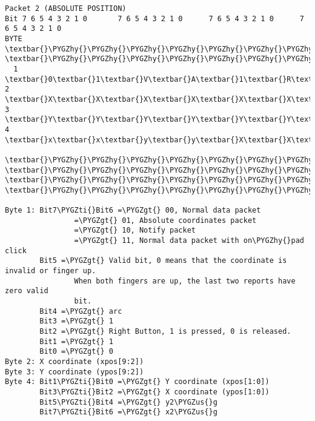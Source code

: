\documentclass[a4paper,8pt,english]{sphinxmanual}
\def\PYGZus{\char`\_}
\def\PYGZgt{\char`\>}
\def\PYGZhy{\char`\-}
\def\PYGZti{\char`\~}
\begin{document}
\begin{Verbatim}[commandchars=\\\{\}]
Packet 2 (ABSOLUTE POSITION)
Bit 7 6 5 4 3 2 1 0       7 6 5 4 3 2 1 0      7 6 5 4 3 2 1 0      7 6 5 4 3 2 1 0
BYTE  \textbar{}\PYGZhy{}\PYGZhy{}\PYGZhy{}\PYGZhy{}\PYGZhy{}\PYGZhy{}\PYGZhy{}\PYGZhy{}\PYGZhy{}\PYGZhy{}\PYGZhy{}\PYGZhy{}\PYGZhy{}\PYGZhy{}\PYGZhy{}\textbar{}BYTE \textbar{}\PYGZhy{}\PYGZhy{}\PYGZhy{}\PYGZhy{}\PYGZhy{}\PYGZhy{}\PYGZhy{}\PYGZhy{}\PYGZhy{}\PYGZhy{}\PYGZhy{}\PYGZhy{}\PYGZhy{}\PYGZhy{}\PYGZhy{}\textbar{}BYTE\textbar{}\PYGZhy{}\PYGZhy{}\PYGZhy{}\PYGZhy{}\PYGZhy{}\PYGZhy{}\PYGZhy{}\PYGZhy{}\PYGZhy{}\PYGZhy{}\PYGZhy{}\PYGZhy{}\PYGZhy{}\PYGZhy{}\PYGZhy{}\textbar{}BYTE\textbar{}\PYGZhy{}\PYGZhy{}\PYGZhy{}\PYGZhy{}\PYGZhy{}\PYGZhy{}\PYGZhy{}\PYGZhy{}\PYGZhy{}\PYGZhy{}\PYGZhy{}\PYGZhy{}\PYGZhy{}\PYGZhy{}\PYGZhy{}\textbar{}
  1   \textbar{}0\textbar{}1\textbar{}V\textbar{}A\textbar{}1\textbar{}R\textbar{}1\textbar{}0\textbar{}  2  \textbar{}X\textbar{}X\textbar{}X\textbar{}X\textbar{}X\textbar{}X\textbar{}X\textbar{}X\textbar{}  3 \textbar{}Y\textbar{}Y\textbar{}Y\textbar{}Y\textbar{}Y\textbar{}Y\textbar{}Y\textbar{}Y\textbar{}  4 \textbar{}x\textbar{}x\textbar{}y\textbar{}y\textbar{}X\textbar{}X\textbar{}Y\textbar{}Y\textbar{}
      \textbar{}\PYGZhy{}\PYGZhy{}\PYGZhy{}\PYGZhy{}\PYGZhy{}\PYGZhy{}\PYGZhy{}\PYGZhy{}\PYGZhy{}\PYGZhy{}\PYGZhy{}\PYGZhy{}\PYGZhy{}\PYGZhy{}\PYGZhy{}\textbar{}     \textbar{}\PYGZhy{}\PYGZhy{}\PYGZhy{}\PYGZhy{}\PYGZhy{}\PYGZhy{}\PYGZhy{}\PYGZhy{}\PYGZhy{}\PYGZhy{}\PYGZhy{}\PYGZhy{}\PYGZhy{}\PYGZhy{}\PYGZhy{}\textbar{}    \textbar{}\PYGZhy{}\PYGZhy{}\PYGZhy{}\PYGZhy{}\PYGZhy{}\PYGZhy{}\PYGZhy{}\PYGZhy{}\PYGZhy{}\PYGZhy{}\PYGZhy{}\PYGZhy{}\PYGZhy{}\PYGZhy{}\PYGZhy{}\textbar{}    \textbar{}\PYGZhy{}\PYGZhy{}\PYGZhy{}\PYGZhy{}\PYGZhy{}\PYGZhy{}\PYGZhy{}\PYGZhy{}\PYGZhy{}\PYGZhy{}\PYGZhy{}\PYGZhy{}\PYGZhy{}\PYGZhy{}\PYGZhy{}\textbar{}

Byte 1: Bit7\PYGZti{}Bit6 =\PYGZgt{} 00, Normal data packet
                =\PYGZgt{} 01, Absolute coordinates packet
                =\PYGZgt{} 10, Notify packet
                =\PYGZgt{} 11, Normal data packet with on\PYGZhy{}pad click
        Bit5 =\PYGZgt{} Valid bit, 0 means that the coordinate is invalid or finger up.
                When both fingers are up, the last two reports have zero valid
                bit.
        Bit4 =\PYGZgt{} arc
        Bit3 =\PYGZgt{} 1
        Bit2 =\PYGZgt{} Right Button, 1 is pressed, 0 is released.
        Bit1 =\PYGZgt{} 1
        Bit0 =\PYGZgt{} 0
Byte 2: X coordinate (xpos[9:2])
Byte 3: Y coordinate (ypos[9:2])
Byte 4: Bit1\PYGZti{}Bit0 =\PYGZgt{} Y coordinate (xpos[1:0])
        Bit3\PYGZti{}Bit2 =\PYGZgt{} X coordinate (ypos[1:0])
        Bit5\PYGZti{}Bit4 =\PYGZgt{} y2\PYGZus{}g
        Bit7\PYGZti{}Bit6 =\PYGZgt{} x2\PYGZus{}g


\end{Verbatim}
\end{document}
